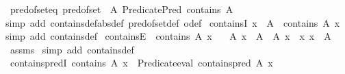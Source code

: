 \begin{isabellebody}
\ pred{\isacharunderscore}{\kern0pt}of{\isacharunderscore}{\kern0pt}set{\isacharunderscore}{\kern0pt}eq{\isacharcolon}{\kern0pt}\ {\isachardoublequoteopen}pred{\isacharunderscore}{\kern0pt}of{\isacharunderscore}{\kern0pt}set\ {\isasymequiv}\ {\isasymlambda}A{\isachardot}{\kern0pt}\ Predicate{\isachardot}{\kern0pt}Pred\ {\isacharparenleft}{\kern0pt}contains\ A{\isacharparenright}{\kern0pt}{\isachardoublequoteclose}\isanewline
%
\isadelimproof
%
\endisadelimproof
%
\isatagproof
{}\isamarkupfalse%
{\isacharparenleft}{\kern0pt}simp\ add{\isacharcolon}{\kern0pt}\ contains{\isacharunderscore}{\kern0pt}def{\isacharbrackleft}{\kern0pt}abs{\isacharunderscore}{\kern0pt}def{\isacharbrackright}{\kern0pt}\ pred{\isacharunderscore}{\kern0pt}of{\isacharunderscore}{\kern0pt}set{\isacharunderscore}{\kern0pt}def\ o{\isacharunderscore}{\kern0pt}def{\isacharparenright}{\kern0pt}%
\endisatagproof
{\isafoldproof}%
%
\isadelimproof
\isanewline
%
\endisadelimproof
\isanewline
{}\isamarkupfalse%
\ containsI{\isacharcolon}{\kern0pt}\ {\isachardoublequoteopen}x\ {\isasymin}\ A\ {\isacharequal}{\kern0pt}{\isacharequal}{\kern0pt}{\isachargreater}{\kern0pt}\ contains\ A\ x{\isachardoublequoteclose}\ \isanewline
%
\isadelimproof
%
\endisadelimproof
%
\isatagproof
{}\isamarkupfalse%
{\isacharparenleft}{\kern0pt}simp\ add{\isacharcolon}{\kern0pt}\ contains{\isacharunderscore}{\kern0pt}def{\isacharparenright}{\kern0pt}%
\endisatagproof
{\isafoldproof}%
%
\isadelimproof
\isanewline
%
\endisadelimproof
\isanewline
{}\isamarkupfalse%
\ containsE{\isacharcolon}{\kern0pt}\ \ {\isachardoublequoteopen}contains\ A\ x{\isachardoublequoteclose}\isanewline
\ \ \ A{\isacharprime}{\kern0pt}\ x{\isacharprime}{\kern0pt}\ \ {\isachardoublequoteopen}A\ {\isacharequal}{\kern0pt}\ A{\isacharprime}{\kern0pt}{\isachardoublequoteclose}\ {\isachardoublequoteopen}x\ {\isacharequal}{\kern0pt}\ x{\isacharprime}{\kern0pt}{\isachardoublequoteclose}\ {\isachardoublequoteopen}x\ {\isasymin}\ A{\isachardoublequoteclose}\isanewline
%
\isadelimproof
%
\endisadelimproof
%
\isatagproof
{}\isamarkupfalse%
\ assms\ \isamarkupfalse%
{\isacharparenleft}{\kern0pt}simp\ add{\isacharcolon}{\kern0pt}\ contains{\isacharunderscore}{\kern0pt}def{\isacharparenright}{\kern0pt}%
\endisatagproof
{\isafoldproof}%
%
\isadelimproof
\isanewline
%
\endisadelimproof
\isanewline
{}\isamarkupfalse%
\ contains{\isacharunderscore}{\kern0pt}predI{\isacharcolon}{\kern0pt}\ {\isachardoublequoteopen}contains\ A\ x\ {\isacharequal}{\kern0pt}{\isacharequal}{\kern0pt}{\isachargreater}{\kern0pt}\ Predicate{\isachardot}{\kern0pt}eval\ {\isacharparenleft}{\kern0pt}contains{\isacharunderscore}{\kern0pt}pred\ A\ x{\isacharparenright}{\kern0pt}\ {\isacharparenleft}{\kern0pt}{\isacharparenright}{\kern0pt}{\isachardoublequoteclose}\isanewline

\end{isabellebody}
